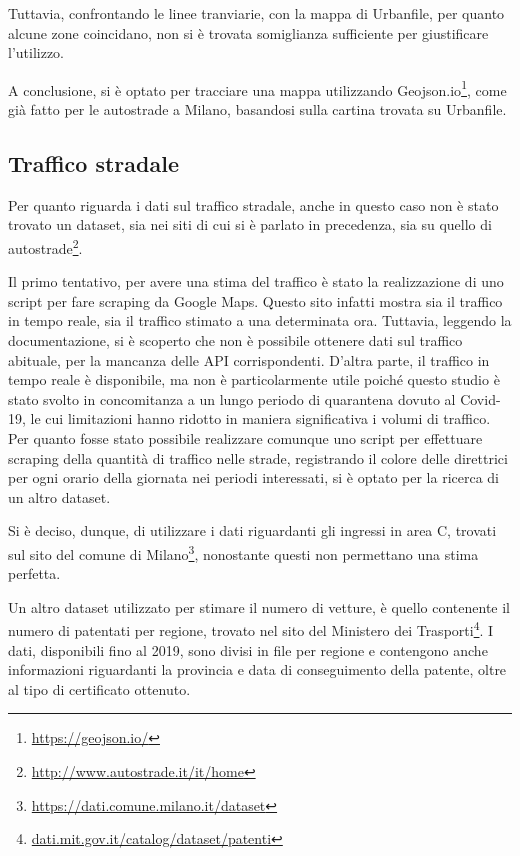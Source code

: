 \documentclass[a4paper]{report}
\begin{document}
Tuttavia, confrontando le linee tranviarie, con la mappa di Urbanfile, 
per quanto alcune zone coincidano, non si è trovata 
somiglianza sufficiente per giustificare l'utilizzo. 

A conclusione, si è optato per tracciare una mappa utilizzando 
Geojson.io\footnote{\url{https://geojson.io/}}, come già fatto per le autostrade a Milano, 
basandosi sulla cartina trovata su Urbanfile. 

\subsection{Traffico stradale}

Per quanto riguarda i dati sul traffico stradale, anche in questo caso non è stato trovato un 
dataset, sia nei siti di cui si è parlato in precedenza, sia su quello di 
autostrade\footnote{\url{http://www.autostrade.it/it/home}}. 

Il primo tentativo, per avere una stima del traffico è stato la realizzazione di uno 
script per fare scraping da Google Maps. 
Questo sito infatti mostra sia il traffico in tempo reale, sia 
il traffico stimato a una determinata ora. 
Tuttavia, leggendo la documentazione, si è scoperto che non è possibile ottenere 
dati sul traffico abituale, per la mancanza delle API corrispondenti. 
D'altra parte, il traffico in tempo reale è disponibile, ma non è particolarmente utile 
poiché questo studio è stato svolto in concomitanza a un lungo periodo di quarantena 
dovuto al Covid-19, le cui limitazioni hanno ridotto in maniera significativa 
i volumi di traffico. 
Per quanto fosse stato possibile realizzare comunque uno script per effettuare 
scraping della quantità di traffico nelle strade, registrando il colore delle 
direttrici per ogni orario della giornata nei periodi interessati, si è 
optato per la ricerca di un altro dataset. 

Si è deciso, dunque, di utilizzare i dati riguardanti gli ingressi in area C, 
trovati sul sito del comune di Milano\footnote{\url{https://dati.comune.milano.it/dataset}}, 
nonostante questi non permettano una stima perfetta. 

Un altro dataset utilizzato per stimare il numero di vetture, è quello contenente 
il numero di patentati per regione, trovato nel sito del Ministero dei 
Trasporti\footnote{\url{dati.mit.gov.it/catalog/dataset/patenti}}. 
I dati, disponibili fino al 2019, sono divisi in file per regione e 
contengono anche informazioni riguardanti la provincia e data di conseguimento della 
patente, oltre al tipo di certificato ottenuto. 
\end{document}
